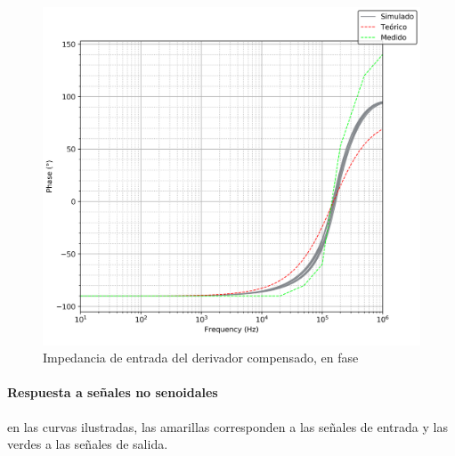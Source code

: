 \begin{figure}[H]
	\centering
	\includegraphics[scale=0.7]{Recursos/Derivador_compensado/impedancia_fase.png}
	\caption{Impedancia de entrada del derivador compensado, en fase}
	\label{fig_derivador_compensado_impedancia_fase}
\end{figure}

\paragraph*{Respuesta a se\~nales no senoidales} en las curvas ilustradas, las amarillas corresponden a las se\~nales de entrada y las verdes
a las se\~nales de salida.

